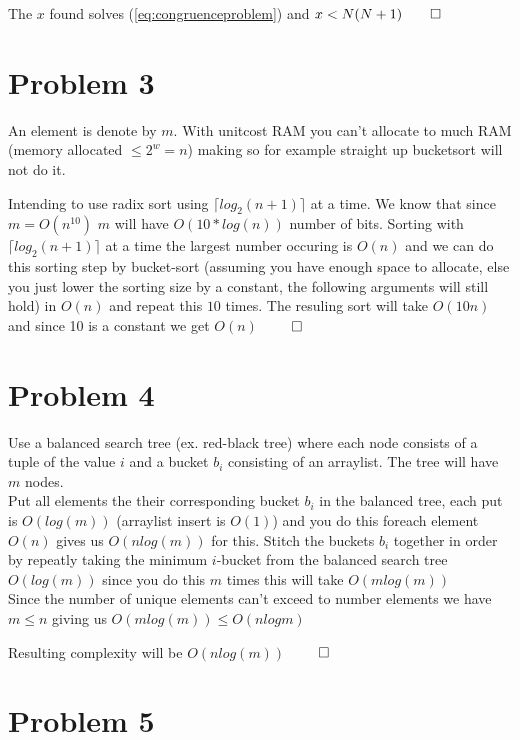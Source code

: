 \documentclass[a4paper,twoside=false,abstract=false,numbers=noenddot,
titlepage=false,headings=small,parskip=half,version=last]{scrartcl}
\begin{document}
The $x$ found solves (\ref{eq:congruenceproblem}) and $x<N(N+1) \qed$

\section{Problem 3}

An element is denote by $m$. With unitcost RAM you can't allocate to much RAM (memory allocated $\le 2^w=n$) making so for example straight up bucketsort will not do it.

Intending to use radix sort using $\lceil{log_2(n+1)}\rceil$ at a time.
We know that since $m=O(n^{10})$ $m$ will have $O(10*log(n))$ number of bits.
Sorting with $\lceil{log_2(n+1)}\rceil$ at a time the largest number occuring is $O(n)$ and we can do this sorting step by bucket-sort (assuming you have enough space to allocate, else you just lower the sorting size by a constant, the following arguments will still hold) in $O(n)$ and repeat this $10$ times.
The resuling sort will take $O(10n)$ and since 10 is a constant we get $O(n)$ $\qed$

\section{Problem 4}

Use a balanced search tree (ex. red-black tree) where each node consists of a tuple of the value $i$ and a bucket $b_i$ consisting of an arraylist.
The tree will have $m$ nodes.\\
Put all elements the their corresponding bucket $b_i$ in the balanced tree, each put is $O(log(m))$ (arraylist insert is $O(1)$) and you do this foreach element $O(n)$ gives us $O(nlog(m))$ for this.
Stitch the buckets $b_i$ together in order by repeatly taking the minimum $i$-bucket from the balanced search tree $O(log(m))$ since you do this $m$ times this will take $O(mlog(m))$\\
Since the number of unique elements can't exceed to number elements we have $m \le n$ giving us $O(mlog(m)) \le O(nlogm)$

Resulting complexity will be $O(nlog(m))$ $\qed$

\section{Problem 5}
\end{document}
